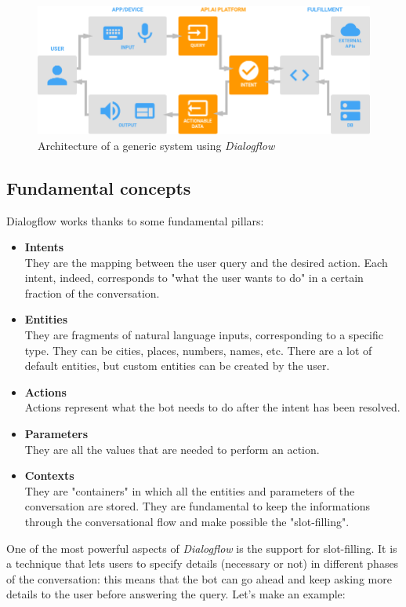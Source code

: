 \documentclass[a4paper,12pt]{report}
\begin{document}
	\begin{figure}[H]
		\centering
		\includegraphics[scale=0.4]{apiai}
		\caption{Architecture of a generic system using \textit{Dialogflow}\cite{apiai}}
	\end{figure}
	
	\subsection{Fundamental concepts}
		Dialogflow works thanks to some fundamental pillars:
		\begin{itemize}
			\item \textbf{Intents}\\
			They are the mapping between the user query and the desired action. Each intent, indeed, corresponds to "what the user wants to do" in a certain fraction of the conversation.
			\item \textbf{Entities}\\
			They are fragments of natural language inputs, corresponding to a specific type. They can be cities, places, numbers, names, etc. There are a lot of default entities, but custom entities can be created by the user.
			\item \textbf{Actions}\\
			Actions represent what the bot needs to do after the intent has been resolved.
			\item \textbf{Parameters}\\
			They are all the values that are needed to perform an action.
			\item \textbf{Contexts}\\
			They are "containers" in which all the entities and parameters of the conversation are stored. They are fundamental to keep the informations through the conversational flow and make possible the "slot-filling".
		\end{itemize}
	One of the most powerful aspects of \textit{Dialogflow} is the support for slot-filling. It is a technique that lets users to specify details (necessary or not) in different phases of the conversation: this means that the bot can go ahead and keep asking more details to the user before answering the query. Let's make an example:
	
\end{document}
